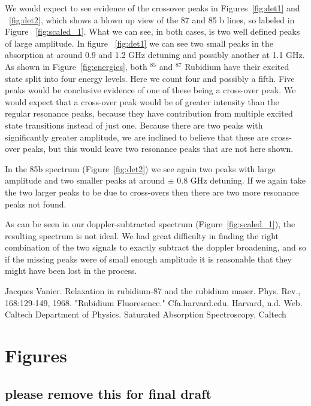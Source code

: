 \documentclass[paper=a4, fontsize=11pt]{scrartcl} %
\numberwithin{equation}{section}
\numberwithin{figure}{section}
\numberwithin{table}{section}
\begin{document}
We would expect to see evidence of the crossover peaks in
Figures~\ref{fig:det1} and ~\ref{fig:det2}, which shows a blown up
view of the 87 and 85 b lines, so labeled in Figure
~\ref{fig:scaled_1}. What we can see, in both cases, is two well
defined peaks of large amplitude. In figure ~\ref{fig:det1} we can see
two small peaks in the absorption at around 0.9 and 1.2 GHz detuning
and possibly another at 1.1 GHz. As shown in
Figure~\ref{fig:energies}, both $^{85}$ and $^{87}$ Rubidium have
their excited state split into four energy levels. Here we count
four and possibly a fifth. Five peaks would be conclusive evidence of
one of these being a cross-over peak. We would expect that a
cross-over peak would be of greater intensity than the regular
resonance peaks, because they have contribution from multiple excited
state transitions instead of just one. Because there are two peaks
with significantly greater amplitude, we are inclined to believe that
these are cross-over peaks, but this would leave two resonance peaks
that are not here shown.

In the 85b spectrum (Figure~\ref{fig:det2}) we see again two peaks
with large amplitude and two smaller peaks at around $\pm$ 0.8 GHz
detuning. If we again take the two larger peaks to be due to
cross-overs then there are two more resonance peaks not found. 

As can be seen in our doppler-subtracted spectrum
(Figure~\ref{fig:scaled_1}),  the resulting spectrum is not ideal. We
had great difficulty in finding the right combination of the two
signals to exactly subtract the doppler broadening, and so if the
missing peaks were of small enough amplitude it is reasonable that
they might have been lost in the process. 



\begin{thebibliography}{99}
Jacques Vanier. Relaxation in rubidium-87 and the
  rubidium maser. Phys. Rev., 168:129-149, 1968.
"Rubidium Fluoresence." Cfa.harvard.edu. Harvard,
  n.d. Web.
Caltech Department of Physics. Saturated Absorption
Spectroscopy. Caltech
\end{thebibliography}



\section{Figures}

\subsection{please remove this for final draft}


\end{document}
